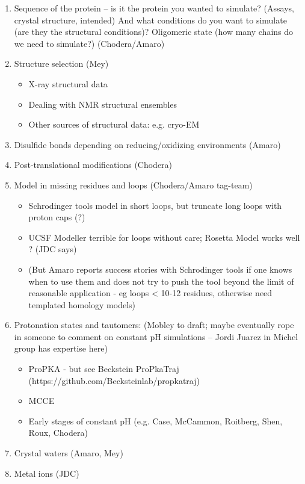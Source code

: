 \documentclass[9pt]{livecoms}
\begin{document}
{\begin{enumerate}
\item Sequence of the protein -- is it the protein you wanted to simulate? (Assays, crystal structure, intended) And what conditions do you want to simulate (are they the structural conditions)? Oligomeric state (how many chains do we need to simulate?) (Chodera/Amaro)
\item Structure selection (Mey) 
    \begin{itemize}
    \item  X-ray structural data
    \item Dealing with NMR structural ensembles
    \item Other sources of structural data: e.g. cryo-EM
    \end{itemize}
\item Disulfide bonds depending on reducing/oxidizing environments (Amaro)
\item Post-translational modifications (Chodera)
\item Model in missing residues and loops (Chodera/Amaro tag-team)
    \begin{itemize}
    \item Schrodinger tools model in short loops, but truncate long loops with proton caps (?)
    \item UCSF Modeller terrible for loops without care; Rosetta Model works well ? (JDC says)
    \item (But Amaro reports success stories with Schrodinger tools if one knows when to use them and does not try to push the tool beyond the limit of reasonable application - eg loops < 10-12 residues, otherwise need templated homology models)
    \end{itemize}
\item Protonation states and tautomers: (Mobley to draft; maybe eventually rope in someone to comment on constant pH simulations -- Jordi Juarez in Michel group has expertise here)
    \begin{itemize}
    \item ProPKA - but see Beckstein ProPkaTraj (https://github.com/Becksteinlab/propkatraj)
    \item MCCE
    \item Early stages of constant pH (e.g. Case, McCammon, Roitberg, Shen, Roux, Chodera)
    \end{itemize}
\item Crystal waters (Amaro, Mey)
\item Metal ions (JDC)



\end{enumerate}}
\end{document}
